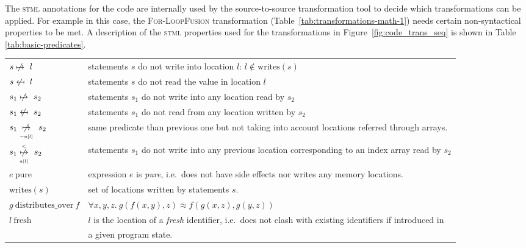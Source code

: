 \documentclass[svgnames,usenames,preprint,nocopyrightspace]{sigplanconf}
\newcommand{\nowrites}{\centernot{\mapsto}}
\newcommand{\noreads}{\centernot{\mapsfrom}}
\newcommand{\pure}{\mathrm{pure}}
\newcommand{\fresh}{\mathrm{fresh}}
\newcommand{\writes}{\mathrm{writes}}
\newcommand{\distributesover}{\mathrm{distributes\_over}}
\newcommand{\nowritesexcarrays}{\underset{_{-a[l]}}{\nowrites}}
\newcommand{\nowritesarray}{\underset{_{a[l]}}{\overset{_<}{\nowrites}}}
\newcommand{\stml}{\textsc{stml}\xspace}
\begin{document}
The \stml annotations for the code are internally used by the
source-to-source transformation tool to decide which transformations
can be applied.  For example in this case, the \textsc{For-LoopFusion}
transformation (Table~\ref{tab:transformations-math-1}) needs certain
non-syntactical properties to be met. A description of the \stml
properties used for the transformations in Figure~\ref{fig:code_trans_seq} is shown in Table \ref{tab:basic-predicates}.



\begin{table*}[t]
\begin{center}
\begin{tabular}{l@{~~~}l}
$s \nowrites\ l$ &
 statements $s$ do not write into location $l$: $l \notin \writes(s)$ \\
$s \noreads\ l$ &
 statements $s$ do not read the value in location $l$\\
$s_1 \nowrites\ s_2$ &
 statements $s_1$ do not write into any location read by $s_2$\\
 $s_1 \noreads\ s_2$ &
 statements $s_1$ do not read from any location written by $s_2$\\
 $s_1 \nowritesexcarrays\ s_2$ &
 same predicate than previous one but not taking into account locations referred through arrays.\\
 $s_1 \nowritesarray\ s_2$ &
 statements $s_1$ do not write into any previous location corresponding to an index array read by $s_2$\\
$e~\pure$ &
 expression $e$ is \emph{pure}, i.e.~does not have side effects nor
 writes any memory locations.\\
 $\writes(s)$ &
 set of locations written by statements $s$.\\
{$g~\distributesover~f$}&
$\forall x, y, z .~ g(f(x,y),z) \approx f(g(x,z),g(y,z))$\\
$l~\fresh$ &
 $l$ is the location of a \emph{fresh} identifier, i.e.~does not clash with existing
 identifiers if introduced in\\& a given program state.\\
\end{tabular}
\end{center}
\caption{Predicates used to express conditions for the application
         transformation rules in Table \ref{tab:transformations-math-1}.}
\label{tab:basic-predicates}
\end{table*}
\end{document}
